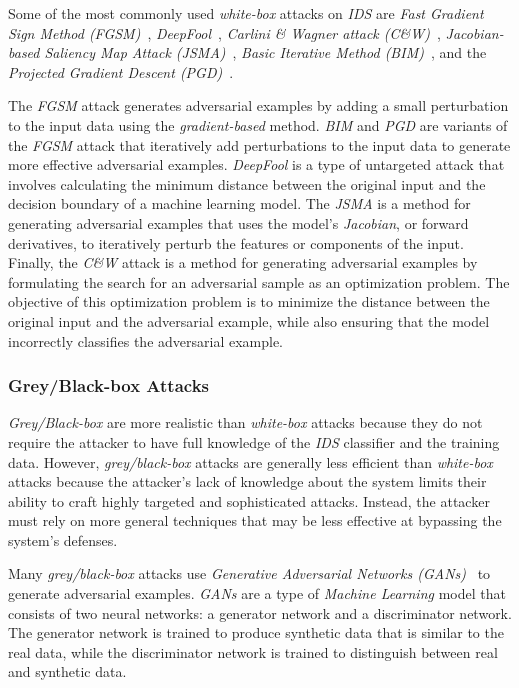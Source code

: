 Some of the most commonly used \textit{white-box} attacks on \textit{IDS} are
\textit{Fast Gradient Sign Method (FGSM)}~\cite{fgsm}, \textit{DeepFool}~\cite{deepfool},
\textit{Carlini \& Wagner attack (C\&W)}~\cite{carlini}, \textit{Jacobian-based Saliency Map Attack (JSMA)}~\cite{jsma},
\textit{Basic Iterative Method (BIM)}~\cite{bim}, and the \textit{Projected Gradient Descent (PGD)}~\cite{pgd}.

The \textit{FGSM} attack generates adversarial examples by adding a small perturbation to the input data using the
\textit{gradient-based} method.
\textit{BIM} and \textit{PGD} are variants of the \textit{FGSM} attack that iteratively add perturbations to the input
data to generate more effective adversarial examples.
\textit{DeepFool} is a type of untargeted attack that involves calculating the minimum distance between the original
input and the decision boundary of a machine learning model.
The \textit{JSMA} is a method for generating adversarial examples that uses the model's \textit{Jacobian}, or forward
derivatives, to iteratively perturb the features or components of the input.
Finally, the \textit{C\&W} attack is a method for generating adversarial examples by formulating the search for an
adversarial sample as an optimization problem.
The objective of this optimization problem is to minimize the distance between the original input and the adversarial
example, while also ensuring that the model incorrectly classifies the adversarial example.


\subsubsection{Grey/Black-box Attacks}\label{subsubsec:grey-black-box-attacks}
\textit{Grey/Black-box} are more realistic than \textit{white-box} attacks because they do not require the attacker to
have full knowledge of the \textit{IDS} classifier and the training data.
However, \textit{grey/black-box} attacks are generally less efficient than \textit{white-box} attacks because the
attacker's lack of knowledge about the system limits their ability to craft highly targeted and sophisticated attacks.
Instead, the attacker must rely on more general techniques that may be less effective at bypassing the system's
defenses.

Many \textit{grey/black-box} attacks use \textit{Generative Adversarial Networks (GANs)}~\cite{goodfellow2020generative}
to generate adversarial examples.
\textit{GANs} are a type of \textit{Machine Learning} model that consists of two neural networks: a generator network
and a discriminator network.
The generator network is trained to produce synthetic data that is similar to the real data, while the discriminator
network is trained to distinguish between real and synthetic data.


